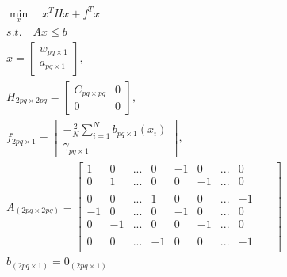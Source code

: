 \begin{equation}
    \begin{aligned}
    \min_x \quad x^THx + f^Tx\\
    s. t. \quad Ax \leq b \\
    x = \left[ \begin{array}{c} w_{pq \times 1}\\ a_{pq \times 1} \end{array} \right],\\
    H_{2pq \times 2pq} =  \left[ \begin{array}{cc} C_{pq \times pq} & 0\\0 & 0 \end{array}  \right], \\
    f_{2pq \times 1}=\left[ \begin{array}{c} -\frac{2}{N}\sum_{i=1}^N b_{pq \times 1}(x_i)\\\gamma_{pq \times 1}\end{array} \right], \\
    A_{(2pq \times 2pq)} = \left[ \begin{array}{cccccccccc}1&0&...&0&-1&0&...&0\\0&1&...&0&0&-1&...&0\\&&&&&&&&&\\0&0&...&1&0&0&...&-1\\
-1&0&...&0&-1&0&...&0\\0&-1&...&0&0&-1&...&0\\&&&&&&&&&\\0&0&...&-1&0&0&...&-1\\\end{array}\right]\\
b_{(2pq \times 1)}=0_{(2pq \times 1)}
    \end{aligned}
\end{equation}
